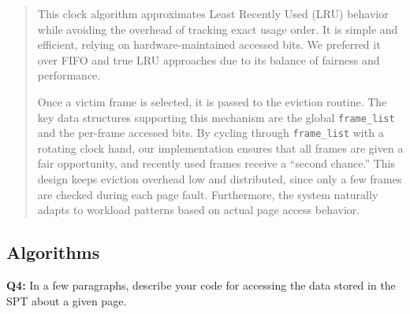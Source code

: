 \documentclass[a4paper,11pt]{paper}
\begin{document}
\begin{quote}
This clock algorithm approximates Least Recently Used (LRU) behavior while avoiding the overhead of tracking exact usage order. It is simple and efficient, relying on hardware-maintained accessed bits. We preferred it over FIFO and true LRU approaches due to its balance of fairness and performance.

Once a victim frame is selected, it is passed to the eviction routine. The key data structures supporting this mechanism are the global \texttt{frame\_list} and the per-frame accessed bits. By cycling through \texttt{frame\_list} with a rotating clock hand, our implementation ensures that all frames are given a fair opportunity, and recently used frames receive a “second chance.” This design keeps eviction overhead low and distributed, since only a few frames are checked during each page fault. Furthermore, the system naturally adapts to workload patterns based on actual page access behavior.

\end{quote}

\subsection{Algorithms}

\textbf{Q4:} In a few paragraphs, describe your code for accessing the data
stored in the SPT about a given page.
\end{document}
